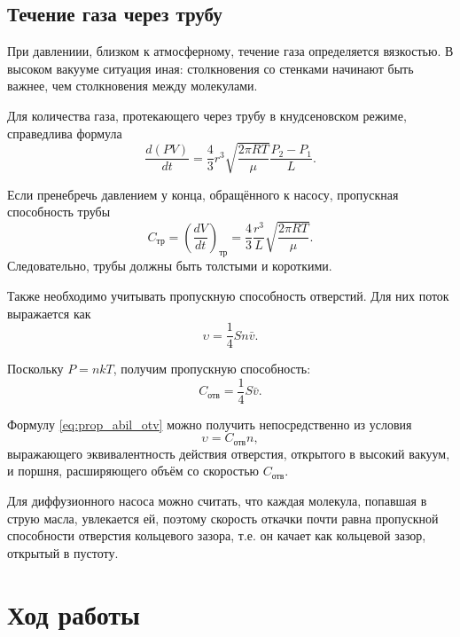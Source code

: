 \documentclass[12pt]{article}
\begin{document}
	\subsection*{Течение газа через трубу}
	
	При давлениии, близком к атмосферному, течение газа определяется вязкостью. В высоком вакууме ситуация иная: столкновения со стенками начинают быть важнее, чем столкновения между молекулами.
	
	Для количества газа, протекающего через трубу в кнудсеновском режиме, справедлива формула
	\begin{equation}
		\label{eq:knudsen_stream}
		\frac{d(PV)}{dt}=\frac{4}{3}r^3 \sqrt{\frac{2\pi RT}{\mu}} \frac{P_2-P_1}{L}.
	\end{equation}
	
	Если пренебречь давлением у конца, обращённого к насосу, пропускная способность трубы
	\begin{equation}
		\label{eq:prop_abil_tube}
		C_\text{тр}=\left( \frac{dV}{dt} \right) _\text{тр} = \frac{4}{3} \frac{r^3}{L} \sqrt{\frac{2\pi RT}{\mu}}.
	\end{equation}
	Следовательно, трубы должны быть толстыми и короткими.
	
	Также необходимо учитывать пропускную способность отверстий. Для них поток выражается как
	\begin{equation}
		\label{eq:stream_otv}
		\upsilon=\frac{1}{4} Sn\bar{v}.
	\end{equation}
	
	Поскольку $P=nkT$, получим пропускную способность:
	\begin{equation}
		\label{eq:prop_abil_otv}
		C_\text{отв}=\frac{1}{4} S\bar{v}.
	\end{equation}
	
	Формулу \eqref{eq:prop_abil_otv} можно получить непосредственно из условия $$ \upsilon=C_\text{отв}n, $$ выражающего эквивалентность действия отверстия, открытого в высокий вакуум, и поршня, расширяющего объём со скоростью $C_\text{отв}$.
	
	Для диффузионного насоса можно считать, что каждая молекула, попавшая в струю масла, увлекается ей, поэтому скорость откачки почти равна пропускной способности отверстия кольцевого зазора, т.е. он качает как кольцевой зазор, открытый в пустоту.
	
	\section*{Ход работы}
	
\end{document}
